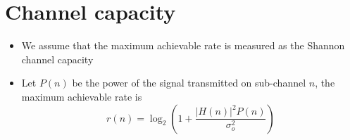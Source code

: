 \section*{Channel capacity}

\begin{itemize}
    \item We assume that the maximum achievable rate is measured as the Shannon channel capacity
    \item Let \( P(n) \) be the power of the signal transmitted on sub-channel \( n \), the maximum achievable rate is 
    \[ r(n) = \log_2 \left( 1 + \frac{|H(n)|^2 P(n)}{\sigma_o^2} \right) \]
\end{itemize}
